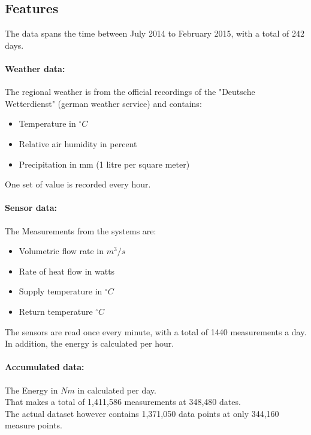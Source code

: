 \documentclass[	DIV=calc,%
				paper=a4,%
				fontsize=11pt,%
				twocolumn]{scrartcl}	 %
\begin{document}
\subsection{Features}
The data spans the time between July 2014 to February 2015, with a total of 242 days.

\paragraph{Weather data:}
The regional weather is from the official recordings of the "Deutsche Wetterdienst" (german weather service) and contains:

\begin{itemize}
\item Temperature in $^\circ C$
\item Relative air humidity in percent
\item Precipitation in mm (1 litre per square meter)
\end{itemize}

One set of value is recorded every hour.

\paragraph{Sensor data:}
The Measurements from the systems are:

\begin{itemize}
\item Volumetric flow rate in $m^3 / s$
\item Rate of heat flow in watts
\item Supply temperature in $^\circ C$
\item Return temperature $^\circ C$
\end{itemize}

The sensors are read once every minute, with a total of 1440 measurements a day. In addition, the energy is calculated per hour.\\

\paragraph{Accumulated data:}
The Energy in $Nm$ in calculated per day.\\

\noindent
That makes a total of 1,411,586 measurements at 348,480 dates.\\
The actual dataset however contains 1,371,050 data points at only 344,160 measure points.
\end{document}
